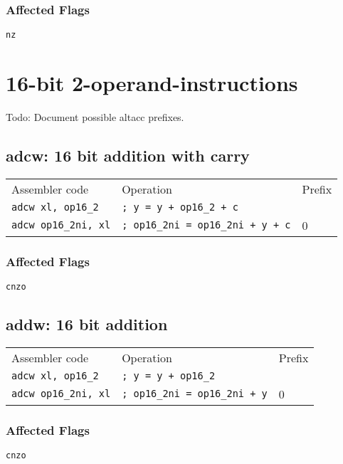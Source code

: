 \documentclass{book}
\begin{document}
\subsubsection*{Affected Flags}

\texttt{nz}


\section{16-bit 2-operand-instructions}

Todo: Document possible altacc prefixes.

\subsection{adcw: 16 bit addition with carry}

\begin{tabular}{l l l}
Assembler code              & Operation                                & Prefix \\
\texttt{adcw xl, op16\_2}   & \texttt{; y = y + op16\_2 + c}           & \\
\texttt{adcw op16\_2ni, xl} & \texttt{; op16\_2ni = op16\_2ni + y + c} & 0
\end{tabular}

\subsubsection*{Affected Flags}

\texttt{cnzo}


\subsection{addw: 16 bit addition}

\begin{tabular}{l l l}
Assembler code              & Operation                            & Prefix \\
\texttt{adcw xl, op16\_2}   & \texttt{; y = y + op16\_2}           & \\
\texttt{adcw op16\_2ni, xl} & \texttt{; op16\_2ni = op16\_2ni + y} & 0
\end{tabular}

\subsubsection*{Affected Flags}

\texttt{cnzo}
\end{document}
